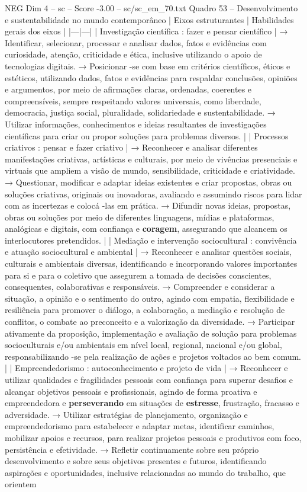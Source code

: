 \begin{textsample}{NEG Dim 4 – sc – Score -3.00 – sc/sc\_em\_70.txt}  \label{ex:f4_neg_254}
Quadro 53 – Desenvolvimento e sustentabilidade no mundo contemporâneo | Eixos estruturantes | Habilidades gerais dos eixos | |---|---| | Investigação científica : fazer e pensar científico | → Identificar, selecionar, processar e analisar dados, fatos e evidências com curiosidade, atenção, criticidade e ética, inclusive utilizando o apoio de tecnologias digitais. → Posicionar -se com base em critérios científicos, éticos e estéticos, utilizando dados, fatos e evidências para respaldar conclusões, opiniões e argumentos, por meio de afirmações claras, ordenadas, coerentes e compreensíveis, sempre respeitando valores universais, como liberdade, democracia, justiça social, pluralidade, solidariedade e sustentabilidade. → Utilizar informações, conhecimentos e ideias resultantes de investigações científicas para criar ou propor soluções para problemas diversos. | | Processos criativos : pensar e fazer criativo | → Reconhecer e analisar diferentes manifestações criativas, artísticas e culturais, por meio de vivências presenciais e virtuais que ampliem a visão de mundo, sensibilidade, criticidade e criatividade. → Questionar, modificar e adaptar ideias existentes e criar propostas, obras ou soluções criativas, originais ou inovadoras, avaliando e assumindo riscos para lidar com as incertezas e colocá -las em prática. → Difundir novas ideias, propostas, obras ou soluções por meio de diferentes linguagens, mídias e plataformas, analógicas e digitais, com confiança e \textbf{coragem}, assegurando que alcancem os interlocutores pretendidos. | | Mediação e intervenção sociocultural : convivência e atuação sociocultural e ambiental | → Reconhecer e analisar questões sociais, culturais e ambientais diversas, identificando e incorporando valores importantes para si e para o coletivo que assegurem a tomada de decisões conscientes, consequentes, colaborativas e responsáveis. → Compreender e considerar a situação, a opinião e o sentimento do outro, agindo com empatia, flexibilidade e resiliência para promover o diálogo, a colaboração, a mediação e resolução de conflitos, o combate ao preconceito e a valorização da diversidade. → Participar ativamente da proposição, implementação e avaliação de solução para problemas socioculturais e/ou ambientais em nível local, regional, nacional e/ou global, responsabilizando -se pela realização de ações e projetos voltados ao bem comum. | | Empreendedorismo : autoconhecimento e projeto de vida | → Reconhecer e utilizar qualidades e fragilidades pessoais com confiança para superar desafios e alcançar objetivos pessoais e profissionais, agindo de forma proativa e empreendedora e \textbf{perseverando} em situações de \textbf{estresse}, frustração, fracasso e adversidade. → Utilizar estratégias de planejamento, organização e empreendedorismo para estabelecer e adaptar metas, identificar caminhos, mobilizar apoios e recursos, para realizar projetos pessoais e produtivos com foco, persistência e efetividade. → Refletir continuamente sobre seu próprio desenvolvimento e sobre seus objetivos presentes e futuros, identificando aspirações e oportunidades, inclusive relacionadas ao mundo do trabalho, que orientem 
\end{textsample}
